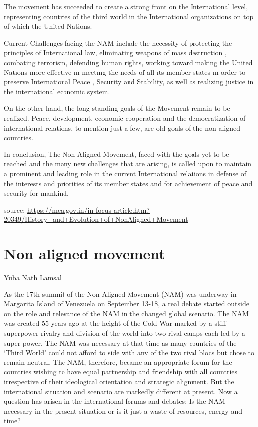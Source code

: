 \documentclass[
  openany]{book}
\begin{document}
The movement has succeeded to create a strong front on the International level, representing countries of the third world in the International organizations on top of which the United Nations.

Current Challenges facing the NAM include the necessity of protecting the principles of International law, eliminating weapons of mass destruction , combating terrorism, defending human rights, working toward making the United Nations more effective in meeting the needs of all its member states in order to preserve International Peace , Security and Stability, as well as realizing justice in the international economic system.

On the other hand, the long-standing goals of the Movement remain to be realized. Peace, development, economic cooperation and the democratization of international relations, to mention just a few, are old goals of the non-aligned countries.

In conclusion, The Non-Aligned Movement, faced with the goals yet to be reached and the many new challenges that are arising, is called upon to maintain a prominent and leading role in the current International relations in defense of the interests and priorities of its member states and for achievement of peace and security for mankind.

source: \url{https://mea.gov.in/in-focus-article.htm?20349/History+and+Evolution+of+NonAligned+Movement}

\hypertarget{non-aligned-movement}{%
\section{Non aligned movement}\label{non-aligned-movement}}

Yuba Nath Lamsal

As the 17th summit of the Non-Aligned Movement (NAM) was underway in Margarita Island of Venezuela on September 13-18, a real debate started outside on the role and relevance of the NAM in the changed global scenario. The NAM was created 55 years ago at the height of the Cold War marked by a stiff superpower rivalry and division of the world into two rival camps each led by a super power. The NAM was necessary at that time as many countries of the `Third World' could not afford to side with any of the two rival blocs but chose to remain neutral. The NAM, therefore, became an appropriate forum for the countries wishing to have equal partnership and friendship with all countries irrespective of their ideological orientation and strategic alignment. But the international situation and scenario are markedly different at present. Now a question has arisen in the international forums and debates: Is the NAM necessary in the present situation or is it just a waste of resources, energy and time?
\end{document}
